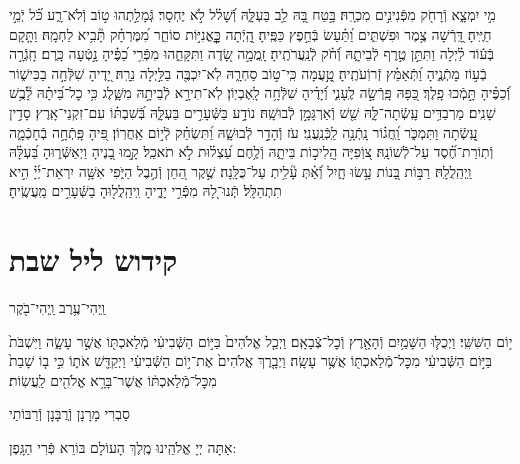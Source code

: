 \documentclass[twoside, openany, parskip=half, 11pt]{book}
\begin{document}
 מִ֣י יִמְצָ֑א וְֿרָחֹ֖ק מִפְּֿנִינִ֣ים מִכְרָֽהּ׃ \hfill \break
בָּ֣טַח בָּ֭הּ לֵ֥ב בַּעְלָּ֑הּ וְֿ֝שָׁל֗ל לֹ֣א יֶחְסָר׃ \hfill \break
גְּֿמָלַ֣תְהוּ ט֣וֹב וְֿלֹא־רָ֑ע כֹּ֝֗ל יְֿמֵ֣י חַיֶּֽיהָ׃ \hfill \break
דָּֽ֭רְֿשָׁה צֶ֥מֶר וּפִשְׁתִּ֑ים וַ֝תַּ֗עַשׂ בְּֿחֵ֣פֶץ כַּפֶּֽיהָ׃ \hfill \break
הָֽ֭יְֿתָה כׇׇׇׇׇׇׇׇׇׇׇׇׇׇׇׇָּֽאֳנִיּ֣וֹת סוֹחֵ֑ר מִ֝מֶּרְחָ֗ק תָּ֘בִ֥יא לַחְמָֽהּ׃ \hfill \break
וַתָּ֤קָם בְּֿע֬וֹד לַ֗יְלָה וַתִּתֵּ֣ן טֶ֣רֶף לְֿבֵיתָ֑הּ וְֿ֝חֹ֗ק לְֿנַֽעֲרֹתֶֽיהָ׃ \hfill \break
זָֽמֲמָ֣ה שָׂ֭דֶה וַתִּקָּחֵ֑הוּ מִפְּֿרִ֥י כַ֝פֶּ֗יהָ נָ֣טְֿעָה כָּֽרֶם׃ \hfill \break
חָֽגְֿרָ֣ה בְֿע֣וֹז מָתְֿנֶ֑יהָ וַ֝תְּֿאַמֵּ֗ץ זְֿרוֹֽעֹתֶֽיהָ׃ \hfill \break
טָֽ֣֭עֲמָה כִּֽי־ט֣וֹב סַחְרָ֑הּ לֹֽא־יִכְבֶּ֖ה בַלַּ֣יְלָה נֵרָֽהּ׃ \hfill \break
יָ֭דֶיהָ שִׁלְּֿחָ֣ה בַכִּישׁ֑וֹר וְֿ֝כַפֶּ֗יהָ תָּ֣מְֿכוּ פָֽלֶךְ׃ \hfill \break
כַּ֭פָּהּ פָּֽרְֿשָׂ֣ה לֶֽעָנִ֑י וְֿ֝יָדֶ֗יהָ שִׁלְּֿחָ֥ה לָֽאֶבְיֽוֹן׃ \hfill \break
לֹֽא־תִירָ֣א לְֿבֵיתָ֣הּ מִשָּׁ֑לֶג כִּ֥י כׇל־בֵּ֝יתָ֗הּ לָ֘בֻ֥שׁ שָׁנִֽים׃ \hfill \break
מַרְבַדִּ֥ים עָֽשְֿׂתָה־לָּ֑הּ שֵׁ֖שׁ וְֿאַרְגָּמָ֣ן לְֿבוּשָֽׁהּ׃ \hfill \break
נוֹדָ֣ע בַּשְּֿׁעָרִ֣ים בַּעְלָּ֑הּ בְּֿ֝שִׁבְתּ֗וֹ עִם־זִקְנֵי־אָֽרֶץ׃ \hfill \break
סָדִ֣ין עָֽ֭שְֿׂתָה וַתִּמְכֹּ֑ר וַֽ֝חֲג֗וֹר נָֽתְֿנָ֥ה לַֽכְּֿנַֽעֲנִֽי׃ \hfill \break
עֹז וְֿהָדָ֣ר לְֿבוּשָׁ֑הּ וַ֝תִּשְׂחַ֗ק לְֿי֣וֹם אַֽחֲרֽוֹן׃ \hfill \break
פִּ֭יהָ פָּֽתְֿחָ֣ה בְֿחָכְֿמָ֑ה וְֿתֽוֹרַת־חֶ֝֗סֶד עַל־לְֿשׁוֹנָֽהּ׃ \hfill \break
צ֭וֹֽפִיָּה הֲֽלִיכ֣וֹת בֵּיתָ֑הּ וְֿלֶ֥חֶם עַ֝צְל֗וּת לֹ֣א תֹאכֵֽל׃ \hfill \break
קָ֣מוּ בָ֭נֶיהָ וַיְאַשְּֿׁר֑וּהָ בַּ֝עְלָּ֗הּ וַֽיְהַֽלֲלָֽהּ׃ \hfill \break
רַבּ֣וֹת בָּ֭נוֹת עָ֥שׂוּ חָ֑יִל וְֿ֝אַ֗תְּ עָ֘לִ֥יתְ עַל־כֻּלָּֽנָה׃ \hfill \break
שֶׁ֣קֶר הַ֭חֵן וְֿהֶ֣בֶל הַיֹּ֑פִי אִשָּׁ֥ה יִרְאַת־יְ֜יָ֗ הִ֣יא תִתְהַלָּֽל׃\hfill \break
תְּֽֿנוּ־לָ֭הּ מִפְּֿרִ֣י יָדֶ֑יהָ וִֽיהַֽלֲל֖וּהָ בַשְּֿׁעָרִ֣ים מַֽעֲשֶֽׂיהָ׃\hfill \break


\section*{ קידוש ליל שבת }

\begin{small}וַֽיְהִי־עֶ֥רֶב וַֽיְהִי־בֹ֖קֶר\end{small}
 י֥וֹם הַשִּׁשִּֽׁי׃ וַיְכֻלּ֛וּ הַשָּׁמַ֥יִם וְֿהָאָ֖רֶץ וְֿכׇל־צְֿבָאָֽם׃ וַיְכַ֤ל אֱלֹהִים֙ בַּיּ֣וֹם הַשְּֿׁבִיעִ֔י מְֿלַאכְתּ֖וֹ אֲשֶׁ֣ר עָשָׂ֑ה וַיִּשְׁבֹּת֙ בַּיּ֣וֹם הַשְּֿׁבִיעִ֔י מִכׇּל־מְֿלַאכְתּ֖וֹ אֲשֶׁ֥ר עָשָֽׂה׃ וַיְבָ֤רֶךְ אֱלֹהִים֙ אֶת־י֣וֹם הַשְּֿׁבִיעִ֔י וַיְקַדֵּ֖שׁ אֹת֑וֹ כִּ֣י ב֤וֹ שָׁבַת֙ מִכׇּל־מְֿלַאכְתּ֔וֹ אֲשֶׁר־בָּרָ֥א אֱלֹהִ֖ים לַֽעֲשֽׂוֹת׃

\begin{footnotesize}
סַבְרִי מָרָנָן וְֿרֲבָּנָן וְֿרַבּוֹתַי\\
\end{footnotesize}
 אַתָּה יְיָ אֱלֹהֵֽינוּ מֶֽלֶךְ הָעוֹלָם בּוֹרֵא פְּֿרִי הַגָּֽפֶן:
\end{document}
